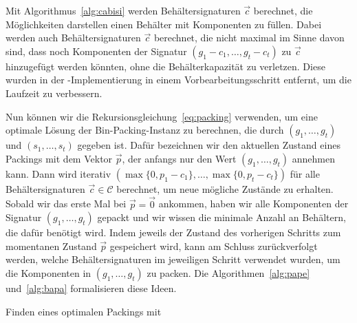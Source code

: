 \begin{rem}
    Mit Algorithmus~\ref{alg:cabisi} werden Behältersignaturen $\vec{c}$ berechnet, die Möglichkeiten darstellen einen Behälter mit Komponenten zu füllen.
    Dabei werden auch Behältersignaturen $\vec{c}$ berechnet, die nicht maximal im Sinne davon sind, dass noch Komponenten der Signatur $(g_1 - c_1, \ldots, g_t - c_t)$ zu $\vec{c}$ hinzugefügt werden könnten, ohne die Behälterkapazität zu verletzen.
    Diese wurden in der \Cpp\hyp Implementierung in einem Vorbearbeitungsschritt entfernt, um die Laufzeit zu verbessern.
\end{rem}

Nun können wir die Rekursionsgleichung~\eqref{eq:packing} verwenden, um eine optimale Lösung der Bin-Packing-Instanz zu berechnen, die durch $(g_1, \ldots, g_t)$ und $(s_1, \ldots, s_t)$ gegeben ist.
Dafür bezeichnen wir den aktuellen Zustand eines Packings mit dem Vektor $\vec{p}$, der anfangs nur den Wert $(g_1, \ldots, g_t)$ annehmen kann.
Dann wird iterativ $(\max\{0, p_1 - c_1\}, \ldots, \max\{0, p_t - c_t\})$ für alle Behältersignaturen $\vec{c} \in \mathcal{C}$ berechnet, um neue mögliche Zustände zu erhalten.
Sobald wir das erste Mal bei $\vec{p} = \vec{0}$ ankommen, haben wir alle Komponenten der Signatur $(g_1, \ldots, g_t)$ gepackt und wir wissen die minimale Anzahl an Behältern, die dafür benötigt wird.
Indem jeweils der Zustand des vorherigen Schritts zum momentanen Zustand $\vec{p}$ gespeichert wird, kann am Schluss zurückverfolgt werden, welche Behältersignaturen im jeweiligen Schritt verwendet wurden, um die Komponenten in $(g_1, \ldots, g_t)$ zu packen.
Die Algorithmen~\ref{alg:pape} und~\ref{alg:bapa} formalisieren diese Ideen.

\begin{algorithm}
    \caption{Finden eines optimalen Packings mit }
    \label{alg:pape}
    \begin{algorithmic}[1]
                 
                    \EndIf
                \EndFor
                \EndFor
            \EndFor
        \EndFunction
    \end{algorithmic}
\end{algorithm}

